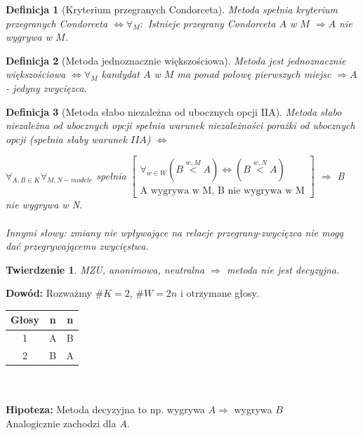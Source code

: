 \documentclass[12pt,a4paper]{article}
\theoremstyle{break}
\newtheorem{definition}{Definicja}[section]
\newtheorem{theorem}{Twierdzenie}[section]
\newcommand{\witw}{$\Leftrightarrow$}
\begin{document}
		\begin{definition}[Kryterium przegranych Condorceta]			
			Metoda spełnia kryterium przegranych Condorceta \witw $\forall_M:$ Istnieje przegrany Condorceta $A$ w $M$ $\Rightarrow A$ nie wygrywa w $M$.
		\end{definition}
		
		\begin{definition}[Metoda jednoznacznie większościowa]
			Metoda jest jednoznacznie większościowa \witw $\forall_M$ kandydat $A$ w $M$ ma ponad połowę pierwszych miejsc $\Rightarrow A$ - jedyny zwycięzca.
		\end{definition}
		
		\begin{definition}[Metoda słabo niezależna od ubocznych opcji IIA]
			Metoda słabo niezależna od ubocznych opcji spełnia warunek niezależności porażki od ubocznych opcji (spełnia słaby warunek $IIA$) \witw
			
			$\forall_{A,B\in K} \forall_{M,N - modele}$ spełnia 
			$\begin{bmatrix}
				\forall_{w\in W} (B\overset{w,M}{<}A) \text{\witw} (B\overset{w,N}{<}A) \\
				\text{A wygrywa w M, B nie wygrywa w M}		 
			\end{bmatrix}$	$\Rightarrow$ B nie wygrywa w N.\\\\
			
			Innymi słowy: zmiany nie wpływające na relacje przegrany-zwycięzca nie mogą dać przegrywającemu zwycięstwa.		
			
		\end{definition}
		
		\begin{theorem}
			MZU, anonimowa, neutralna $\Rightarrow$ metoda nie jest decyzyjna.
		\end{theorem}
		\noindent \textbf{Dowód:} Rozważmy $\# K = 2$, $\# W = 2n$ i otrzymane głosy.\\
		
		\begin{tabular}{|c|c|c|}\hline
			Głosy&n&n\\\hline
			1&A&B\\\hline
			2&B&A\\\hline
		\end{tabular}\\\\
		\textbf{Hipoteza:} Metoda decyzyjna to np. wygrywa $A \Rightarrow$ wygrywa $B$ \faBolt\\
		Analogicznie zachodzi dla $A$.
		
\end{document}
